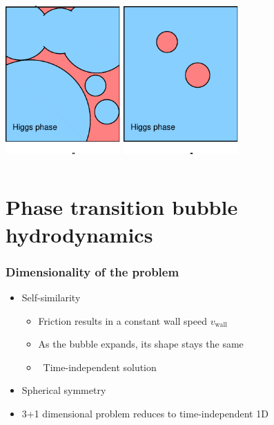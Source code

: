 \begin{frame}
\begin{columns}
\begin{column}{0.4\textwidth}
        \includegraphics[width=0.33\textwidth]{../fig/lecture_notes/HiggsBubble2}%
        \includegraphics[width=0.33\textwidth]{../fig/lecture_notes/HiggsBubble3}
    \end{column}
    \end{columns}
\end{frame}

\section{Phase transition bubble hydrodynamics}

\begin{frame}
    \frametitle{Dimensionality of the problem}
    \begin{itemize}
        \item Self-similarity
        \begin{itemize}
            \item Friction results in a constant wall speed $v_\text{wall}$
            \item As the bubble expands, its shape stays the same
            \item \textrightarrow \ Time-independent solution
        \end{itemize}
        \item Spherical symmetry
        \item 3+1 dimensional problem reduces to time-independent 1D
    \end{itemize}
\end{frame}

